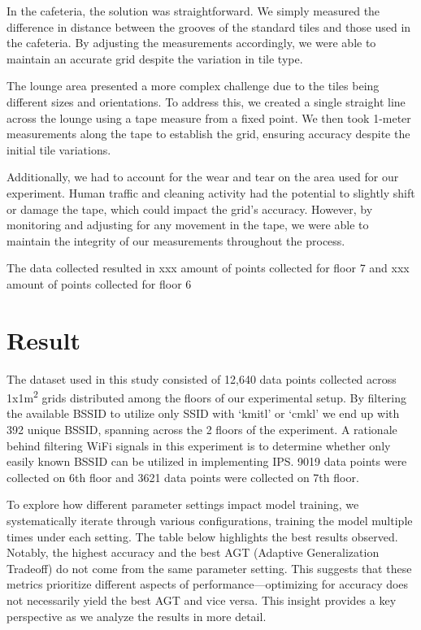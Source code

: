 \documentclass[conference]{IEEEtran}
\begin{document}
	In the cafeteria, the solution was straightforward. We simply measured the difference in distance between the grooves of the standard tiles and those used in the cafeteria. By adjusting the measurements accordingly, we were able to maintain an accurate grid despite the variation in tile type.
	
	The lounge area presented a more complex challenge due to the tiles being different sizes and orientations. To address this, we created a single straight line across the lounge using a tape measure from a fixed point. We then took 1-meter measurements along the tape to establish the grid, ensuring accuracy despite the initial tile variations.
	
	Additionally, we had to account for the wear and tear on the area used for our experiment. Human traffic and cleaning activity had the potential to slightly shift or damage the tape, which could impact the grid's accuracy. However, by monitoring and adjusting for any movement in the tape, we were able to maintain the integrity of our measurements throughout the process.
	
	
	The data collected resulted in xxx amount of points collected for floor 7 and xxx amount of points collected for floor 6
	
	
	\section{Result}
	The dataset used in this study consisted of 12,640 data points collected across 1x1m\textsuperscript{2} grids distributed among the floors of our experimental setup. By filtering the available BSSID to utilize only SSID with ‘kmitl’ or ‘cmkl’ we end up with 392 unique BSSID, spanning across the 2 floors of the experiment. A rationale behind filtering WiFi signals in this experiment is to determine whether only easily known BSSID can be utilized in implementing IPS. 9019 data points were collected on 6th floor and 3621 data points were collected on 7th floor.
	
	To explore how different parameter settings impact model training, we systematically iterate through various configurations, training the model multiple times under each setting. The table below highlights the best results observed. Notably, the highest accuracy and the best AGT (Adaptive Generalization Tradeoff) do not come from the same parameter setting. This suggests that these metrics prioritize different aspects of performance—optimizing for accuracy does not necessarily yield the best AGT and vice versa. This insight provides a key perspective as we analyze the results in more detail.
	
\end{document}
